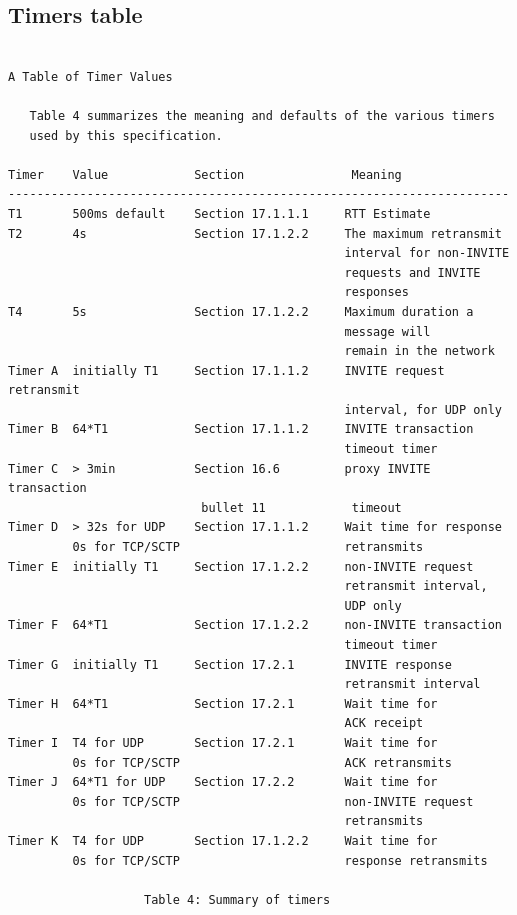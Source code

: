 \documentclass[a4paper]{article}
\begin{document}
\subsection{Timers table}

\begin{verbatim}

A Table of Timer Values

   Table 4 summarizes the meaning and defaults of the various timers
   used by this specification.

Timer    Value            Section               Meaning
----------------------------------------------------------------------
T1       500ms default    Section 17.1.1.1     RTT Estimate
T2       4s               Section 17.1.2.2     The maximum retransmit
                                               interval for non-INVITE
                                               requests and INVITE
                                               responses
T4       5s               Section 17.1.2.2     Maximum duration a
                                               message will
                                               remain in the network
Timer A  initially T1     Section 17.1.1.2     INVITE request retransmit
                                               interval, for UDP only
Timer B  64*T1            Section 17.1.1.2     INVITE transaction
                                               timeout timer
Timer C  > 3min           Section 16.6         proxy INVITE transaction
                           bullet 11            timeout
Timer D  > 32s for UDP    Section 17.1.1.2     Wait time for response
         0s for TCP/SCTP                       retransmits
Timer E  initially T1     Section 17.1.2.2     non-INVITE request
                                               retransmit interval,
                                               UDP only
Timer F  64*T1            Section 17.1.2.2     non-INVITE transaction
                                               timeout timer
Timer G  initially T1     Section 17.2.1       INVITE response
                                               retransmit interval
Timer H  64*T1            Section 17.2.1       Wait time for
                                               ACK receipt
Timer I  T4 for UDP       Section 17.2.1       Wait time for
         0s for TCP/SCTP                       ACK retransmits
Timer J  64*T1 for UDP    Section 17.2.2       Wait time for
         0s for TCP/SCTP                       non-INVITE request
                                               retransmits
Timer K  T4 for UDP       Section 17.1.2.2     Wait time for
         0s for TCP/SCTP                       response retransmits

                   Table 4: Summary of timers

\end{verbatim}
\end{document}
